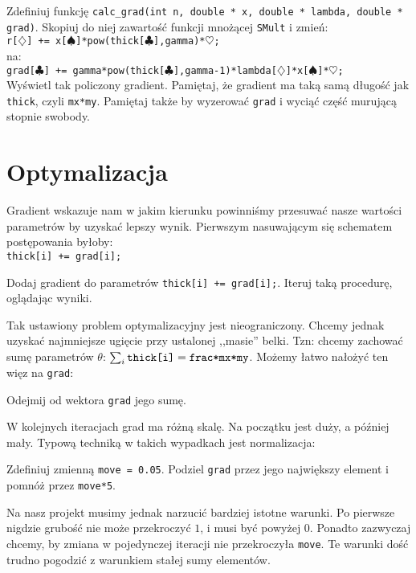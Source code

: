 \documentclass{instrukcja}
\begin{document}
\begin{zad}
Zdefiniuj funkcję {\tt calc\_grad(int n, double * x, double * lambda, double * grad)}. Skopiuj do niej zawartość funkcji mnożącej {\tt SMult} i zmień:\\
{\tt r[$\diamondsuit$] += x[$\spadesuit$]*pow(thick[$\clubsuit$],gamma)*$\heartsuit$;}\\
na:\\
{\tt grad[$\clubsuit$] += gamma*pow(thick[$\clubsuit$],gamma-1)*lambda[$\diamondsuit$]*x[$\spadesuit$]*$\heartsuit$;}\\
Wyświetl tak policzony gradient. Pamiętaj, że gradient ma taką samą długość jak {\tt thick}, czyli {\tt mx*my}. Pamiętaj także by wyzerować {\tt grad} i wyciąć część murującą stopnie swobody.
\end{zad}


\section{Optymalizacja}

Gradient wskazuje nam w jakim kierunku powinniśmy przesuwać nasze wartości parametrów by uzyskać lepszy wynik. Pierwszym nasuwającym się schematem postępowania byłoby:\\
{\tt thick[i] += grad[i]; }
\begin{zad}
Dodaj gradient do parametrów {\tt thick[i] += grad[i];}. Iteruj taką procedurę, oglądając wyniki.
\end{zad}

Tak ustawiony problem optymalizacyjny jest nieograniczony. Chcemy jednak uzyskać najmniejsze ugięcie przy ustalonej ,,masie'' belki. Tzn: chcemy zachować sumę parametrów $\theta$: $\sum_i\text{\tt thick[i]} = \text{\tt frac*mx*my}$. Możemy łatwo nałożyć ten więz na {\tt grad}:

\begin{zad}
Odejmij od wektora {\tt grad} jego sumę.
\end{zad}

W kolejnych iteracjach grad ma różną skalę. Na początku jest duży, a później mały. Typową techniką w takich wypadkach jest normalizacja:

\begin{zad}
Zdefiniuj zmienną {\tt move = 0.05}. Podziel {\tt grad} przez jego największy element i pomnóż przez {\tt move*5}.
\end{zad}

Na nasz projekt musimy jednak narzucić bardziej istotne warunki. Po pierwsze nigdzie grubość nie może przekroczyć $1$, i musi być powyżej $0$. Ponadto zazwyczaj chcemy, by zmiana w pojedynczej iteracji nie przekroczyła {\tt move}. Te warunki dość trudno pogodzić z warunkiem stałej sumy elementów. 
\end{document}
